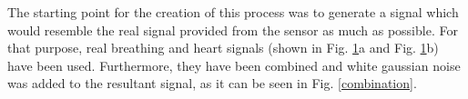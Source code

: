 \documentclass[twoside, twocolumn, spanish] {article}
\begin{document}
The starting point for the creation of this process was to generate a signal which would resemble the real signal provided from the sensor as much as possible. For that purpose, real breathing and heart signals (shown in Fig. \ref{starting_signals}a and Fig. \ref{starting_signals}b) have been used. Furthermore, they have been combined and white gaussian noise was added to the resultant signal, as it can be seen in Fig. \ref{combination}. \\

\begin{figure}[h]
\centering
{} \\ 
\caption{}
\label{starting_signals}
\end{figure}
\end{document}
